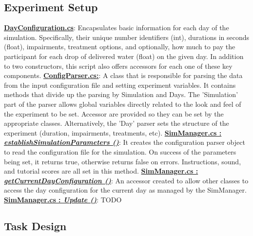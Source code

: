 \documentclass{article}
\begin{document}
\subsection{Experiment Setup} %
\href{https://bit.ly/2FvRTWR}{\textbf{DayConfiguration.cs}}: Encapsulates basic information for each day of the simulation. Specifically, their unique number identifiers (int), durations in seconds (float), impairments, treatment options, and optionally, how much to pay the participant for each drop of delivered water (float) on the given day. In addition to two constructors, this script also offers accessors for each one of these key components. \newline \newline
\href{https://bit.ly/2TZaLYj}{\textbf{ConfigParser.cs:}}: A class that is responsible for parsing the data from the input configuration file and setting experiment variables. It contains methods that divide up the parsing by Simulation and Days. The 'Simulation' part of the parser allows global variables directly related to the look and feel of the experiment to be set. Accessor are provided so they can be set by the appropriate classes. Alternatively, the 'Day' parser sets the structure of the experiment (duration, impairments, treatments, etc). 
\newline \newline
\href{https://bit.ly/2UhmSzq}{\textbf{SimManager.cs : \textit{establishSimulationParameters ()}}}: It creates the configuration parser object to read the configuration file for the simulation. On success of the parameters being set, it returns true, otherwise returns false on errors. Instructions, sound, and tutorial scores are all set in this method. \newline \newline
\href{https://bit.ly/2UhmSzq}{\textbf{SimManager.cs : \textit{getCurrentDayConfiguration ()}}}: An accessor created to allow other classes to access the day configuration for the current day as managed by the SimManager. \newline \newline
\href{https://bit.ly/2UhmSzq}{\textbf{SimManager.cs : \textit{Update ()}}}: TODO 

\subsection{Task Design}
\end{document}
